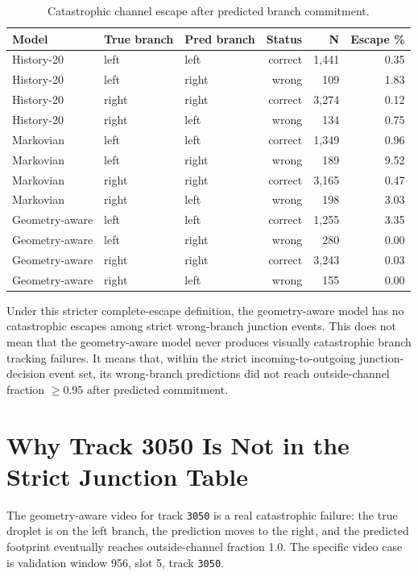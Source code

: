 \documentclass[11pt]{article}
\begin{document}
\begin{table}[h]
\centering
\caption{Catastrophic channel escape after predicted branch commitment.}
\begin{tabular}{lllrrr}
\toprule
Model & True branch & Pred branch & Status & N & Escape \% \\
\midrule
History-20 & left & left & correct & 1,441 & 0.35 \\
History-20 & left & right & wrong & 109 & 1.83 \\
History-20 & right & right & correct & 3,274 & 0.12 \\
History-20 & right & left & wrong & 134 & 0.75 \\
\midrule
Markovian & left & left & correct & 1,349 & 0.96 \\
Markovian & left & right & wrong & 189 & 9.52 \\
Markovian & right & right & correct & 3,165 & 0.47 \\
Markovian & right & left & wrong & 198 & 3.03 \\
\midrule
Geometry-aware & left & left & correct & 1,255 & 3.35 \\
Geometry-aware & left & right & wrong & 280 & 0.00 \\
Geometry-aware & right & right & correct & 3,243 & 0.03 \\
Geometry-aware & right & left & wrong & 155 & 0.00 \\
\bottomrule
\end{tabular}
\end{table}

Under this stricter complete-escape definition, the geometry-aware model has no
catastrophic escapes among strict wrong-branch junction events.  This does not
mean that the geometry-aware model never produces visually catastrophic branch
tracking failures.  It means that, within the strict incoming-to-outgoing
junction-decision event set, its wrong-branch predictions did not reach
outside-channel fraction $\geq 0.95$ after predicted commitment.

\section{Why Track 3050 Is Not in the Strict Junction Table}

The geometry-aware video for track \texttt{3050} is a real catastrophic failure:
the true droplet is on the left branch, the prediction moves to the right, and
the predicted footprint eventually reaches outside-channel fraction 1.0.  The
specific video case is validation window 956, slot 5, track \texttt{3050}.
\end{document}

